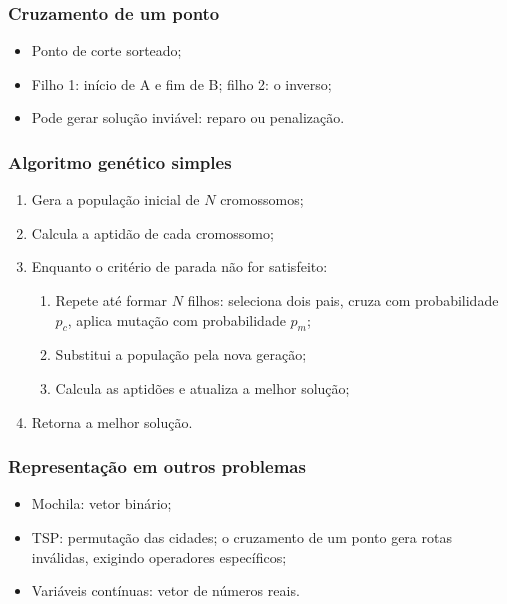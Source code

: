 \documentclass[fleqn]{beamer}
\newcommand{\vetor}[2]{%
	\foreach \v [count=\i] in {#2}{%
		\node[bit\v] at (\i*0.65,#1) {\v};
	}%
}
\begin{document}
\begin{frame}
	\frametitle{Cruzamento de um ponto}
	\begin{center}
	\end{center}
	\begin{itemize}
		\item Ponto de corte sorteado;
		\item Filho 1: início de A e fim de B; filho 2: o inverso;
		\item Pode gerar solução inviável: reparo ou penalização.
	\end{itemize}
\end{frame}

\begin{frame}
	\frametitle{Algoritmo genético simples}
	\begin{enumerate}
		\item Gera a população inicial de $N$ cromossomos;
		\item Calcula a aptidão de cada cromossomo;
		\item Enquanto o critério de parada não for satisfeito:
		\begin{enumerate}
			\item Repete até formar $N$ filhos: seleciona dois pais,
				cruza com probabilidade $p_c$, aplica mutação com
				probabilidade $p_m$;
			\item Substitui a população pela nova geração;
			\item Calcula as aptidões e atualiza a melhor solução;
		\end{enumerate}
		\item Retorna a melhor solução.
	\end{enumerate}
\end{frame}

\begin{frame}
	\frametitle{Representação em outros problemas}
	\begin{itemize}
		\item Mochila: vetor binário;
		\item TSP: permutação das cidades; o cruzamento de um ponto
			gera rotas inválidas, exigindo operadores específicos;
		\item Variáveis contínuas: vetor de números reais.
	\end{itemize}
\end{frame}
\end{document}
